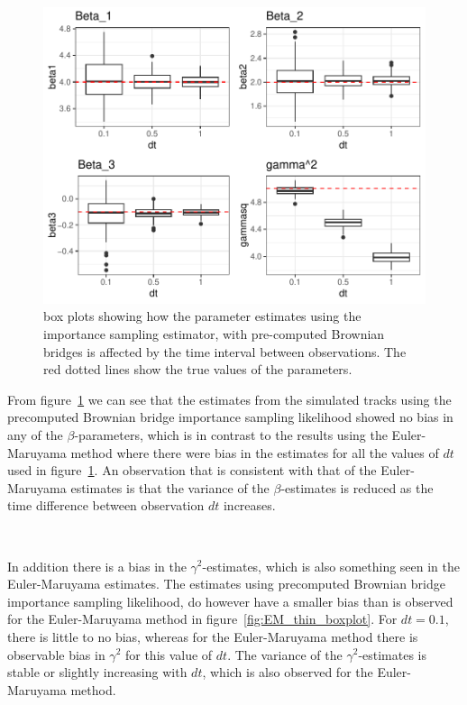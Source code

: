 \begin{figure}[H]
    \centering
    \includegraphics[width=\linewidth]{Images/Results/varying dt estimates precomputed BB.pdf}
    \caption[Box plots of Parameter Estimates for various observation intervals]{box plots showing how the parameter estimates using the importance sampling estimator, with pre-computed Brownian bridges is affected by the time interval between observations. The red dotted lines show the true values of the parameters.}
    \label{fig:varying dt boxplot precomputed BB}
\end{figure}




From figure~\ref{fig:varying dt boxplot precomputed BB} we can see that the estimates from the simulated tracks using the precomputed Brownian bridge importance sampling likelihood showed no bias in any of the $\beta$-parameters, which is in contrast to the results using the Euler-Maruyama method where there were bias in the estimates for all the values of $dt$ used in figure~\ref{fig:varying dt boxplot precomputed BB}. An observation that is consistent with that of the Euler-Maruyama estimates is that the variance of the $\beta$-estimates is reduced as the time difference between observation $dt$ increases. 

\

In addition there is a bias in the $\gamma^2$-estimates, which is also something seen in the Euler-Maruyama estimates. The estimates using precomputed Brownian bridge importance sampling likelihood, do however have a smaller bias than is observed for the Euler-Maruyama method in figure~\ref{fig:EM_thin_boxplot}. For $dt=0.1$, there is little to no bias, whereas for the Euler-Maruyama method there is observable bias in $\gamma^2$ for this value of $dt$. The variance of the $\gamma^2$-estimates is stable or slightly increasing with $dt$, which is also observed for the Euler-Maruyama method.


